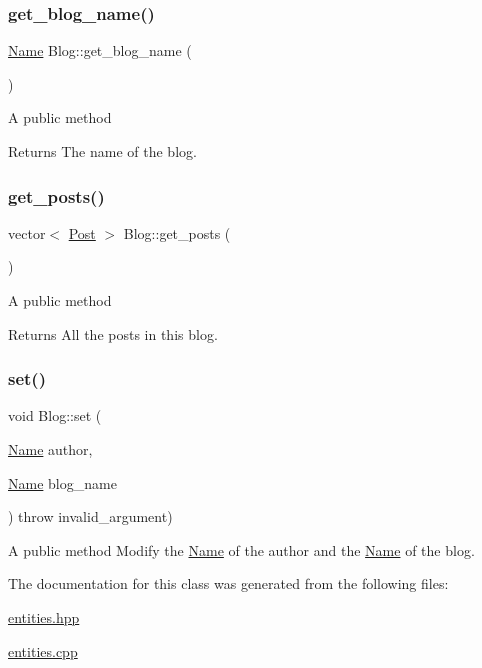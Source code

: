 \subsubsection{\texorpdfstring{get\+\_\+blog\+\_\+name()}{get\_blog\_name()}}
{\footnotesize\ttfamily \hyperlink{class_name}{Name} Blog\+::get\+\_\+blog\+\_\+name (\begin{DoxyParamCaption}{ }\end{DoxyParamCaption})}

A public method \begin{DoxyReturn}{Returns}
The name of the blog. 
\end{DoxyReturn}
\mbox{\label{class_blog_a5143eadadb62ee67205e5ee6665165a5}} 
\subsubsection{\texorpdfstring{get\+\_\+posts()}{get\_posts()}}
{\footnotesize\ttfamily vector$<$ \hyperlink{class_post}{Post} $>$ Blog\+::get\+\_\+posts (\begin{DoxyParamCaption}{ }\end{DoxyParamCaption})}

A public method \begin{DoxyReturn}{Returns}
All the posts in this blog. 
\end{DoxyReturn}
\mbox{\label{class_blog_a68d4c09dcba38658631dbec6d8eb0872}} 
\subsubsection{\texorpdfstring{set()}{set()}}
{\footnotesize\ttfamily void Blog\+::set (\begin{DoxyParamCaption}\item[{\hyperlink{class_name}{Name}}]{author,  }\item[{\hyperlink{class_name}{Name}}]{blog\+\_\+name }\end{DoxyParamCaption}) throw  invalid\+\_\+argument) }

A public method Modify the \hyperlink{class_name}{Name} of the author and the \hyperlink{class_name}{Name} of the blog. 

The documentation for this class was generated from the following files\+:\begin{DoxyCompactItemize}
\item 
\hyperlink{entities_8hpp}{entities.\+hpp}\item 
\hyperlink{entities_8cpp}{entities.\+cpp}\end{DoxyCompactItemize}
